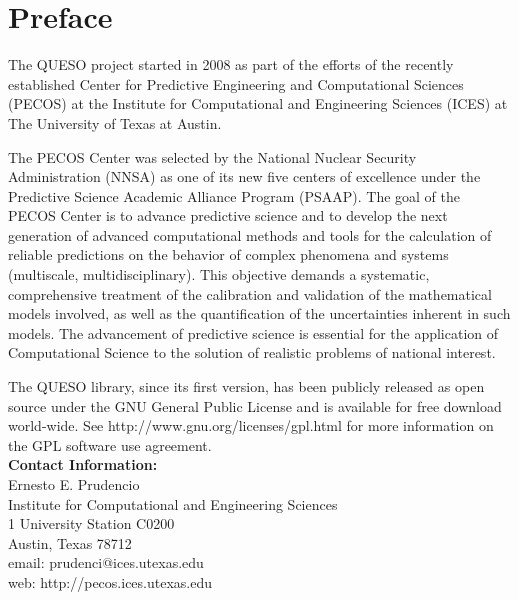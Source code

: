 
\clearpage
\thispagestyle{empty}
\chapter*{Preface}
$~$\\
The QUESO project started in 2008 as part
of the efforts of the recently established Center for Predictive Engineering and Computational Sciences (PECOS)
at the Institute for Computational and Engineering Sciences (ICES) at The University of Texas at Austin.

The PECOS Center was selected by the National Nuclear Security Administration (NNSA) as one of its new five centers of excellence
under the Predictive Science Academic Alliance Program (PSAAP).
The goal of the PECOS Center is
to advance predictive science and to develop the next generation of advanced computational methods and tools
for the calculation of reliable predictions on the behavior of complex phenomena and systems (multiscale, multidisciplinary).
This objective demands a systematic, comprehensive treatment of the calibration and validation of the mathematical models involved,
as well as the quantification of the uncertainties inherent in such models.
The advancement of predictive science is essential for the application of Computational Science to the solution of realistic problems of national interest.

The QUESO library, since its first version, has been publicly released as open source
under the GNU General Public License and is available for free download world-wide.
See http://www.gnu.org/licenses/gpl.html for more information on the GPL software use agreement.\\


{\bf Contact Information:}\\
Ernesto E. Prudencio\\
Institute for Computational and Engineering Sciences\\
1 University Station C0200\\
Austin, Texas 78712\\
email: prudenci@ices.utexas.edu\\
web: http://pecos.ices.utexas.edu\\
$~$\\

